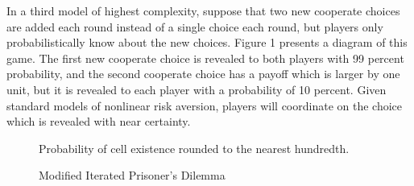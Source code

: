 \documentclass[AER]{/Users/zyl357/Documents/GitHub/research-dissertation-case-for-alt-ed/papers/alt-ed-survey/aea-latex-templates/AEA}
\begin{document}
In a third model of highest complexity, suppose that two new cooperate
choices are added each round instead of a single choice each round, but
players only probabilistically know about the new choices. Figure 1
presents a diagram of this game. The first new cooperate choice is
revealed to both players with 99 percent probability, and the second cooperate
choice has a payoff which is larger by one unit, but it is revealed to
each player with a probability of 10 percent. Given standard models of nonlinear
risk aversion, players will coordinate on the choice which is revealed
with near certainty.

\begin{figure}
    \centering
    \caption{Modified Iterated Prisoner's Dilemma}
    \label{Modified Iterated PD Label}
    \begin{figurenotes}
        Probability of cell existence rounded to the nearest hundredth.
    \end{figurenotes}
\end{figure}
\end{document}
